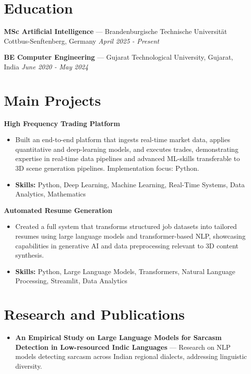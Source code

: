 \documentclass[a4paper,10pt]{article}
\begin{document}
\section*{Education}
\textbf{MSc Artificial Intelligence} — Brandenburgische Technische Universität Cottbus-Senftenberg, Germany \hfill \textit{April 2025 - Present}\par
\vspace{1.5pt}
\textbf{BE Computer Engineering} — Gujarat Technological University, Gujarat, India \hfill \textit{June 2020 - May 2024}\par

\section*{Main Projects}
\textbf{High Frequency Trading Platform}\par
\vspace{1pt}
\begin{itemize}
  \item Built an end-to-end platform that ingests real-time market data, applies quantitative and deep-learning models, and executes trades, demonstrating expertise in real-time data pipelines and advanced ML-skills transferable to 3D scene generation pipelines. Implementation focus: Python.
  \item \textbf{Skills:} Python, Deep Learning, Machine Learning, Real-Time Systems, Data Analytics, Mathematics
\end{itemize}
\vspace{3pt}
\textbf{Automated Resume Generation}\par
\vspace{1pt}
\begin{itemize}
  \item Created a full system that transforms structured job datasets into tailored resumes using large language models and transformer-based NLP, showcasing capabilities in generative AI and data preprocessing relevant to 3D content synthesis.
  \item \textbf{Skills:} Python, Large Language Models, Transformers, Natural Language Processing, Streamlit, Data Analytics
\end{itemize}

\section*{Research and Publications}
\begin{itemize}
\item \textbf{An Empirical Study on Large Language Models for Sarcasm Detection in Low-resourced Indic Languages} — Research on NLP models detecting sarcasm across Indian regional dialects, addressing linguistic diversity.
\end{itemize}
\end{document}
